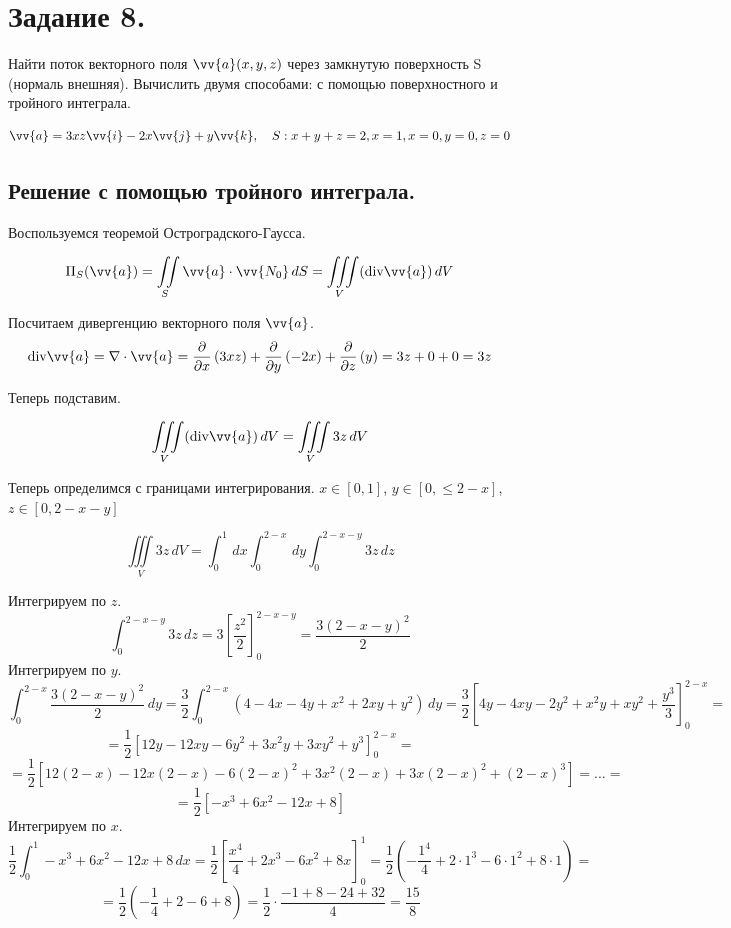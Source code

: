 \newpage
\section{Задание 8.}

Найти поток векторного поля $\vv{a}(x, y, z)$ через замкнутую поверхность S (нормаль внешняя). Вычислить двумя способами: с помощью поверхностного и тройного интеграла.

 $$\vv{a} =3xz\vv{i} - 2x\vv{j}+y\vv{k},\quad S: x+y+z = 2, x=1, x=0, y =0, z =0$$

\subsection{Решение с помощью тройного интеграла.}

Воспользуемся теоремой Остроградского-Гаусса.

$$\Pi_S(\vv{a}) = \iint \limits_S \vv{a} \cdot \vv{N_0} \, dS = \iiint \limits_V (\text{div}\vv{a})\,dV$$

Посчитаем дивергенцию векторного поля $\vv{a}$.
$$\text{div}\vv{a} = \nabla \cdot \vv{a} = \dfrac{\partial}{\partial x}\left(3xz\right) + \dfrac{\partial}{\partial y}\left(- 2x\right) + \dfrac{\partial}{\partial z}\left(y\right) = 3z + 0 + 0 = 3z$$
\begin{center}
    
Теперь подставим.

$$\iiint \limits_V (\text{div}\vv{a})\,dV = \iiint \limits_V 3z \,dV$$

Теперь определимся с границами интегрирования. $x\in[0,1]$, $y\in[0,\leq 2-x]$, $z\in[0,2-x-y]$

$$\iiint \limits_V 3z \,dV = \int_0^1 \, dx \int_{0}^{2-x}\,dy \int_{0}^{2-x-y} 3z\, dz$$

Интегрируем по $z$.
$$ \int_{0}^{2-x-y} 3z \, dz = 3\left[ \frac{z^2}{2} \right]_{0}^{2-x-y} = \frac{3(2-x-y)^2}{2} $$
Интегрируем по $y$.
$$ \int_{0}^{2-x} \frac{3(2-x-y)^2}{2} \, dy = \frac{3}{2} \int_{0}^{2-x} (4 - 4x - 4y + x^2 + 2xy + y^2) \, dy = \frac{3}{2} \left[ 4y - 4xy - 2y^2 + x^2y + xy^2 + \frac{y^3}{3} \right]_{0}^{2-x} =$$
$$ =\frac{1}{2} \left[ 12y - 12xy - 6y^2 + 3x^2y + 3xy^2 + y^3\right]_{0}^{2-x} =$$ 
$$=\frac{1}{2} \left[ 12(2-x) - 12x(2-x) - 6(2-x)^2 + 3x^2(2-x) + 3x(2-x)^2 + (2-x)^3\right] = ... =$$ 
$$=\frac{1}{2}\left[-x^3 + 6x^2 - 12x + 8\right]$$
Интегрируем по $x$.
$$\frac{1}{2}\int_0^1 -x^3 + 6x^2 - 12x + 8\, dx = \frac{1}{2}\left[ \frac{x^4}{4} + 2x^3 - 6x^2 + 8x \right]_0^1 = \frac{1}{2}\left( -\frac{1^4}{4} + 2 \cdot 1^3 - 6 \cdot 1^2 + 8 \cdot 1 \right) =$$
$$=\frac{1}{2}\left(-\frac{1}{4} + 2 - 6 + 8\right) = \frac{1}{2}\cdot\frac{-1 + 8 - 24 + 32}{4} = \boxed{\frac{15}{8}}$$
\end{center}

